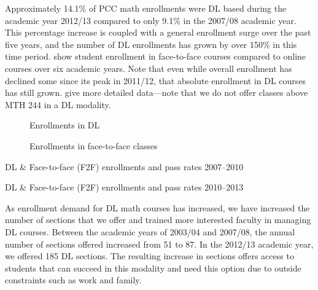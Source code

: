 Approximately 14.1\% of PCC math enrollments were DL based during the
academic year 2012/13 compared to only 9.1\% in the 2007/08 academic year.
This percentage increase is coupled with a general enrollment surge over the
past five years, and the number of DL enrollments has grown by over 150\% in
this time period.  show
student enrollment in face-to-face courses compared to online courses over six
academic years. Note that even while overall enrollment has declined some since
its peak in 2011/12, that absolute enrollment in DL courses has still grown.
 give more detailed data---note that we do not offer classes above MTH 244 in a DL modality.

\begin{figure}[!htb]
    \begin{minipage}[t]{.5\textwidth}
          
          \caption{Enrollments in DL}\label{fig:sec3:DLenrollments}
    \end{minipage}%
    \begin{minipage}[t]{.5\textwidth}
          
          \caption{Enrollments in face-to-face classes}\label{fig:sec3:F2Fenrollments}
    \end{minipage}
\end{figure}

\begin{table}[!htb]
	\begin{widepage}
	\centering
  	\caption{DL \& Face-to-face (F2F) enrollments and pass rates 2007--2010}
    \label{tab:sec3:F2FandDLdata2007}
          
          \vspace{2pc}
  	\caption{DL \& Face-to-face (F2F) enrollments and pass rates 2010--2013}
    \label{tab:sec3:F2FandDLdata2010}
          
          \end{widepage}
\end{table}

As enrollment demand for DL math courses has increased, we have increased the
number of sections that we offer and trained more interested faculty in managing
DL courses.  Between the academic years of 2003/04 and 2007/08, the annual
number of sections offered increased from 51 to 87.  In the 2012/13 academic
year, we offered 185 DL sections.   The resulting increase in sections offers
access to students that can succeed in this modality and need this option due to
outside constraints such as work and family.


